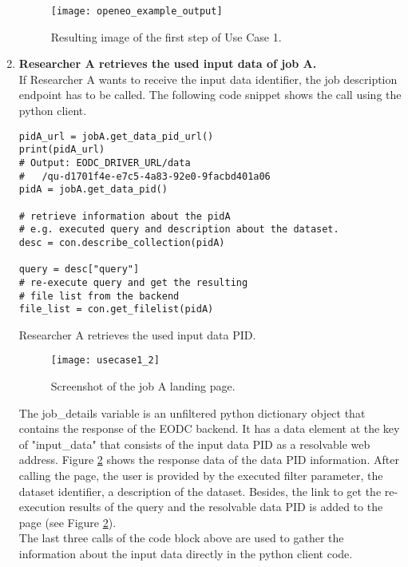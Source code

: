 \documentclass[draft,final]{vutinfth} %
\newenvironment{code}{\captionsetup{type=listing}}{}
\begin{document}
\begin{enumerate}
\begin{figure}[h]
	\centering
	\texttt{[image: openeo\_example\_output]}
	\caption{Resulting image of the first step of Use Case 1.}
	\label{fig:impl_usecase1_min} %
\end{figure}

	\item \textbf{Researcher A retrieves the used input data of job A.} \\
	If Researcher A wants to receive the input data identifier, the job description endpoint has to be called. The following code snippet shows the call using the python client.

\begin{code}
	\begin{verbatim}
pidA_url = jobA.get_data_pid_url()
print(pidA_url)
# Output: EODC_DRIVER_URL/data
#	/qu-d1701f4e-e7c5-4a83-92e0-9facbd401a06
pidA = jobA.get_data_pid()

# retrieve information about the pidA 
# e.g. executed query and description about the dataset.
desc = con.describe_collection(pidA)

query = desc["query"]
# re-execute query and get the resulting 
# file list from the backend
file_list = con.get_filelist(pidA)
	\end{verbatim}
	\caption{Researcher A retrieves the used input data PID.}
	\label{lst:impl_usecase1_2}
\end{code}
	
	\begin{figure}[h]
		\centering
		\texttt{[image: usecase1\_2]}
		\caption{Screenshot of the job A landing page.}
		\label{fig:usecase1-pid} %
	\end{figure}
	
	The job\_details variable is an unfiltered python dictionary object that contains the response of the EODC backend. It has a data element at the key of "input\_data" that consists of the input data PID as a resolvable web address. Figure \ref{fig:usecase1-pid} shows the response data of the data PID information. After calling the page, the user is provided by the executed filter parameter, the dataset identifier, a description of the dataset. Besides, the link to get the re-execution results of the query and the resolvable data PID is added to the page (see Figure \ref{fig:usecase1-pid}). \\
	The last three calls of the code block above are used to gather the information about the input data directly in the python client code.  
	

\end{enumerate}
\end{document}
